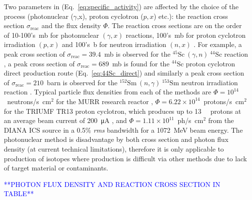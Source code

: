 \documentclass[../main.tex]{subfiles}
\begin{document}
Two parameters in (Eq.~\ref{eq:specific_activity}) are affected by the choice of the process (photonuclear ($\gamma$,x), proton cyclotron ($p,x$) etc.): the reaction cross section $\sigma_{\mathrm{reac}}$ and the flux density $\Phi$. The reaction cross sections are on the order of 10-100's~\si{\milli\barn} for photonuclear $\left(\gamma,x\right)$ reactions, 100's~\si{\milli\barn} for proton cyclotron irradiation $\left(p,x\right)$ and 100's~\si{\barn} for neutron irradiation $\left(n,x\right)$ \cite{zerkin2018experimental}. For example, a peak cross section of $\sigma_{\mathrm{reac}} = 39.4$~\si{\milli\barn} is observed for the $^{45}\mathrm{Sc}~\left(\gamma,n\right)~{}^{44}\mathrm{Sc}$ reaction \cite{veyssiere1974study}, a peak cross section of $\sigma_{\mathrm{reac}}=689$~\si{\milli\barn} is found for the $^{44}\mathrm{Sc}$ proton cyclotron direct production route (Eq.~\ref{eq:44Sc_direct}) \cite{carzaniga2017measurement} and similarly a peak cross section of $\sigma_{\mathrm{reac}}=210$~\si{barn} is observed for the $^{152}\mathrm{Sm}~\left(n,\gamma\right)~{}^{153}\mathrm{Sm}$ neutron irradiation reaction \cite{ma1996production}. Typical particle flux densities from each of the methods are $\Phi=10^{14}$~neutrons/\si{\second\centi\meter}$^{2}$ for the MURR research reactor \cite{ma1996production}, $\Phi=6.22\times 10^{14}$~protons/\si{\second\centi\meter}$^{2}$ for the TRIUMF TR13 proton cyclotron, which produces up to 13~\si{\mega\lectronvolt} protons at an average beam current of 200~\si{\micro\ampere} \cite{hoehr2017medical,laxdale1994beam}, and $\Phi=1.11\times 10^{11}$~ph/\si{\second\centi\meter}$^{2}$ from the DIANA ICS source in a 0.5\% \textit{rms} bandwidth for a 1072~\si{\mega\electronvolt} beam energy. The photonuclear method is disadvantage by both cross section and photon flux density (at current technical limitations), therefore it is only applicable to production of isotopes where production is difficult via other methods due to lack of target material or contaminants.

\textcolor{blue}{**PHOTON FLUX DENSITY AND REACTION CROSS SECTION IN TABLE**}
\end{document}
